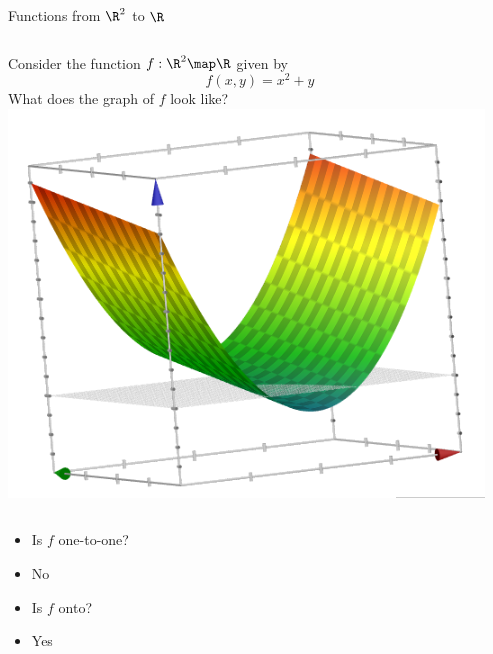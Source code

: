 \documentclass{beamer}
\begin{document}
\begin{frame}{Functions from $\R^2$ to $\R$}

\begin{columns}
\column[T]{5cm}
Consider the function $f:\R^2\map\R$ given by
$$f(x,y) = x^2 + y$$
What does the graph of $f$ look like?
\column[T]{5cm}
\includegraphics[scale=0.3]{tilted-parabolic-sheet}
\end{columns}

\begin{itemize}
\item Is $f$ one-to-one?
\item No
\item Is $f$ onto?
\item Yes
\end{itemize}

\end{frame}
\end{document}
